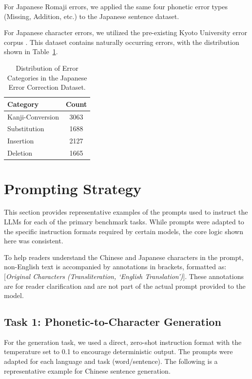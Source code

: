 \documentclass[10pt, a4paper]{article}
\begin{document}
{For Japanese Romaji errors,} we applied the same four phonetic error types (Missing, Addition, etc.) to the Japanese sentence dataset.

{For Japanese character errors,} we utilized the pre-existing Kyoto University error corpus \citep{kyoto2024japanesetexts}. This dataset contains naturally occurring errors, with the distribution shown in Table~\ref{tab:japanese_error_dist}.

\begin{table}[h!]
    \centering
    \small
    \caption{Distribution of Error Categories in the Japanese Error Correction Dataset.}
    \label{tab:japanese_error_dist}
    \begin{tabular}{lc}
    \toprule
    \textbf{Category} & \textbf{Count} \\
    \midrule
    Kanji-Conversion   & 3063 \\
    Substitution  & 1688 \\
    Insertion   & 2127 \\
    Deletion  & 1665 \\
    \bottomrule
    \end{tabular}
\end{table}

\section{Prompting Strategy}
\label{appendix:prompts}

This section provides representative examples of the prompts used to instruct the LLMs for each of the primary benchmark tasks. While prompts were adapted to the specific instruction formats required by certain models, the core logic shown here was consistent.

To help readers understand the Chinese and Japanese characters in the prompt, non-English text is accompanied by annotations in brackets, formatted as: [\textit{Original Characters (Transliteration, `English Translation')}]. These annotations are for reader clarification and are not part of the actual prompt provided to the model.

\subsection{Task 1: Phonetic-to-Character Generation}

For the generation task, we used a direct, zero-shot instruction format with the {temperature} set to 0.1 to encourage deterministic output. The prompts were adapted for each language and task (word/sentence). The following is a representative example for Chinese sentence generation.
\end{document}
